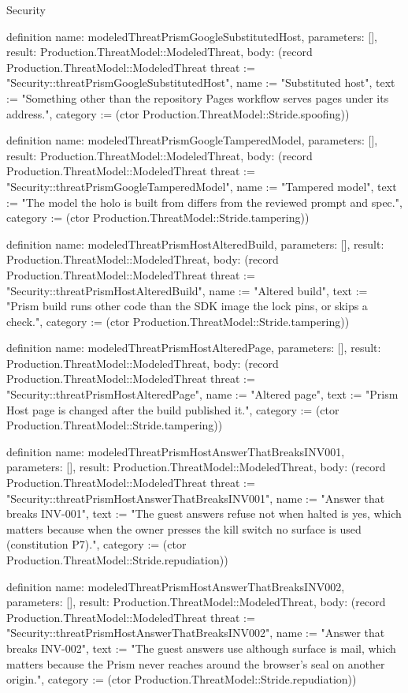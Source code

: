 \begin{lexlean}{Security}
\begin{semanticmodule}
definition{
  name: modeledThreatPrismGoogleSubstitutedHost,
  parameters: [],
  result: Production.ThreatModel::ModeledThreat,
  body: (record Production.ThreatModel::ModeledThreat {threat := "Security::threatPrismGoogleSubstitutedHost", name := "Substituted host", text := "Something other than the repository Pages workflow serves pages under its address.", category := (ctor Production.ThreatModel::Stride.spoofing)})
}

definition{
  name: modeledThreatPrismGoogleTamperedModel,
  parameters: [],
  result: Production.ThreatModel::ModeledThreat,
  body: (record Production.ThreatModel::ModeledThreat {threat := "Security::threatPrismGoogleTamperedModel", name := "Tampered model", text := "The model the holo is built from differs from the reviewed prompt and spec.", category := (ctor Production.ThreatModel::Stride.tampering)})
}

definition{
  name: modeledThreatPrismHostAlteredBuild,
  parameters: [],
  result: Production.ThreatModel::ModeledThreat,
  body: (record Production.ThreatModel::ModeledThreat {threat := "Security::threatPrismHostAlteredBuild", name := "Altered build", text := "Prism build runs other code than the SDK image the lock pins, or skips a check.", category := (ctor Production.ThreatModel::Stride.tampering)})
}

definition{
  name: modeledThreatPrismHostAlteredPage,
  parameters: [],
  result: Production.ThreatModel::ModeledThreat,
  body: (record Production.ThreatModel::ModeledThreat {threat := "Security::threatPrismHostAlteredPage", name := "Altered page", text := "Prism Host page is changed after the build published it.", category := (ctor Production.ThreatModel::Stride.tampering)})
}

definition{
  name: modeledThreatPrismHostAnswerThatBreaksINV001,
  parameters: [],
  result: Production.ThreatModel::ModeledThreat,
  body: (record Production.ThreatModel::ModeledThreat {threat := "Security::threatPrismHostAnswerThatBreaksINV001", name := "Answer that breaks INV-001", text := "The guest answers refuse not when halted is yes, which matters because when the owner presses the kill switch no surface is used (constitution P7).", category := (ctor Production.ThreatModel::Stride.repudiation)})
}

definition{
  name: modeledThreatPrismHostAnswerThatBreaksINV002,
  parameters: [],
  result: Production.ThreatModel::ModeledThreat,
  body: (record Production.ThreatModel::ModeledThreat {threat := "Security::threatPrismHostAnswerThatBreaksINV002", name := "Answer that breaks INV-002", text := "The guest answers use although surface is mail, which matters because the Prism never reaches around the browser's seal on another origin.", category := (ctor Production.ThreatModel::Stride.repudiation)})
}


\end{semanticmodule}
\end{lexlean}
